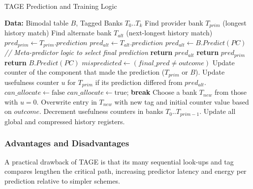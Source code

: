\documentclass[sigconf, screen]{acmart}
\begin{document}
\begin{algorithm}[H]
\caption{TAGE Prediction and Training Logic}
\label{alg:tage_logic}
\begin{algorithmic}[1]
\Statex \textbf{Data:} Bimodal table $B$, Tagged Banks $T_0..T_k$
    \State Find provider bank $T_{prim}$ (longest history match)
    \State Find alternate bank $T_{alt}$ (next-longest history match)
    \State
        \State $pred_{prim} \gets T_{prim}.prediction$
            \State $pred_{alt} \gets T_{alt}.prediction$
        \Else
            \State $pred_{alt} \gets B.Predict(PC)$
        \EndIf
        \State \textit{// Meta-predictor logic to select final prediction}
            \State \textbf{return} $pred_{alt}$
        \Else
            \State \textbf{return} $pred_{prim}$
        \EndIf
    \Else
        \State \textbf{return} $B.Predict(PC)$
    \EndIf
\EndProcedure
\Statex
{}
    \State $mispredicted \gets (final\_pred \neq outcome)$
    \State Update counter of the component that made the prediction ($T_{prim}$ or $B$).
    \State Update usefulness counter $u$ for $T_{prim}$ if its prediction differed from $pred_{alt}$.
    \State
        \State $can\_allocate \gets \text{false}$
                \State $can\_allocate \gets \text{true}$; \textbf{break}
            \EndIf
        \EndFor
        \State
            \State Choose a bank $T_{new}$ from those with $u=0$.
            \State Overwrite entry in $T_{new}$ with new tag and initial counter value based on $outcome$.
        \Else {}
            \State Decrement usefulness counters in banks $T_0..T_{prim-1}$.
        \EndIf
    \EndIf
    \State Update all global and compressed history registers.
\EndProcedure
\end{algorithmic}
\end{algorithm}

\subsubsection{Advantages and Disadvantages}
A practical drawback of TAGE is that its many sequential look-ups and tag compares lengthen the critical path, increasing predictor latency and energy per prediction relative to simpler schemes.
\end{document}
